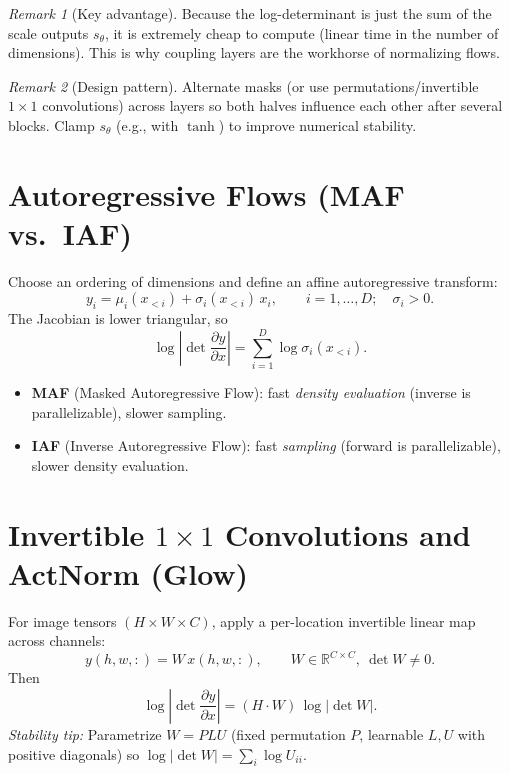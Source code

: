 \documentclass[11pt]{article}
\newcommand{\R}{\mathbb{R}}
\theoremstyle{remark}
\newtheorem*{remark}{Remark}
\newcommand{\pdv}[2]{\frac{\partial #1}{\partial #2}}
\begin{document}
\begin{remark}[Key advantage]
Because the log-determinant is just the sum of the scale outputs $s_\theta$,
it is extremely cheap to compute (linear time in the number of dimensions).
This is why coupling layers are the workhorse of normalizing flows.
\end{remark}

\begin{remark}[Design pattern]
Alternate masks (or use permutations/invertible $1{\times}1$ convolutions) across layers so both halves influence each other after several blocks. Clamp $s_\theta$ (e.g., with $\tanh$) to improve numerical stability.
\end{remark}

\section{Autoregressive Flows (MAF vs.\ IAF)}
Choose an ordering of dimensions and define an affine autoregressive transform:
\begin{equation}
y_i = \mu_i(x_{<i}) + \sigma_i(x_{<i})\, x_i, \qquad i=1,\dots,D;\quad \sigma_i>0.
\label{eq:arf}
\end{equation}
The Jacobian is lower triangular, so
\begin{equation}
\log\left|\det \pdv{y}{x}\right| = \sum_{i=1}^D \log \sigma_i(x_{<i}).
\label{eq:arf-logdet}
\end{equation}
\begin{itemize}[leftmargin=1.5em]
\item \textbf{MAF} (Masked Autoregressive Flow): fast \emph{density evaluation} (inverse is parallelizable), slower sampling.
\item \textbf{IAF} (Inverse Autoregressive Flow): fast \emph{sampling} (forward is parallelizable), slower density evaluation.
\end{itemize}

\section{Invertible $1{\times}1$ Convolutions and ActNorm (Glow)}
For image tensors $(H\times W \times C)$, apply a per-location invertible linear map across channels:
\begin{equation}
y(h,w,:) = W\, x(h,w,:), \qquad W\in \R^{C\times C},\ \det W \neq 0.
\label{eq:1x1}
\end{equation}
Then
\begin{equation}
\log\left|\det \pdv{y}{x}\right| = (H\cdot W)\, \log|\det W|.
\label{eq:1x1-logdet}
\end{equation}
\emph{Stability tip:} Parametrize $W = P L U$ (fixed permutation $P$, learnable $L,U$ with positive diagonals) so $\log|\det W| = \sum_i \log U_{ii}$.
\end{document}
